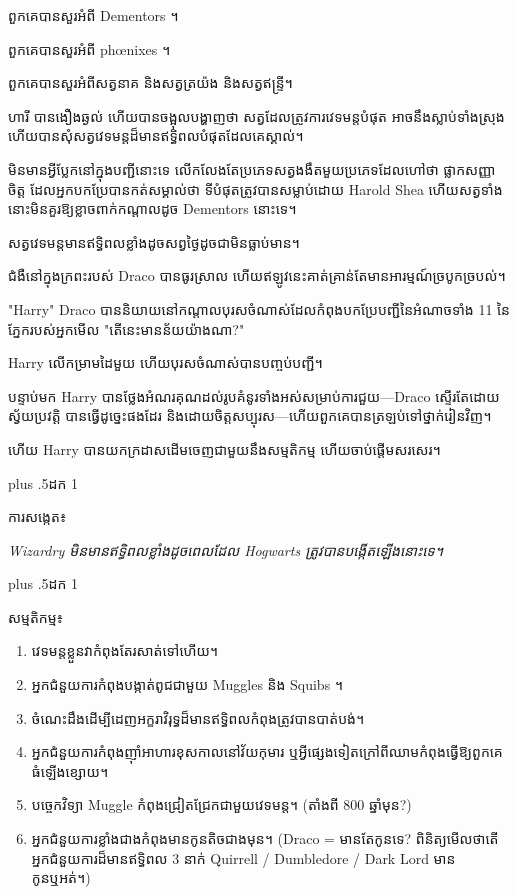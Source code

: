 {{{ពួកគេបានសួរអំពី Dementors ។

ពួកគេបានសួរអំពី phœnixes ។

ពួកគេ​បាន​សួរ​អំពី​សត្វ​នាគ និង​សត្វ​ត្រយ៉ង និង​សត្វ​ឥន្ទ្រី​។

ហារី បាន​ងឿងឆ្ងល់ ហើយ​បាន​ចង្អុល​បង្ហាញ​ថា សត្វ​ដែល​ត្រូវ​ការ​វេទមន្ត​បំផុត អាច​នឹង​ស្លាប់​ទាំង​ស្រុង ហើយ​បាន​សុំ​សត្វ​វេទមន្ត​ដ៏​មាន​ឥទ្ធិពល​បំផុត​ដែល​គេ​ស្គាល់។

មិនមានអ្វីប្លែកនៅក្នុងបញ្ជីនោះទេ លើកលែងតែប្រភេទសត្វងងឹតមួយប្រភេទដែលហៅថា ផ្លាកសញ្ញាចិត្ត ដែលអ្នកបកប្រែបានកត់សម្គាល់ថា ទីបំផុតត្រូវបានសម្លាប់ដោយ Harold Shea ហើយសត្វទាំងនោះមិនគួរឱ្យខ្លាចពាក់កណ្តាលដូច Dementors នោះទេ។

សត្វ​វេទមន្ត​មាន​ឥទ្ធិពល​ខ្លាំង​ដូច​សព្វ​ថ្ងៃ​ដូច​ជា​មិន​ធ្លាប់​មាន។

ជំងឺនៅក្នុងក្រពះរបស់ Draco បានធូរស្រាល ហើយឥឡូវនេះគាត់គ្រាន់តែមានអារម្មណ៍ច្របូកច្របល់។

"Harry" Draco បាននិយាយនៅកណ្តាលបុរសចំណាស់ដែលកំពុងបកប្រែបញ្ជីនៃអំណាចទាំង 11 នៃភ្នែករបស់អ្នកមើល "តើនេះមានន័យយ៉ាងណា?"

Harry លើកម្រាមដៃមួយ ហើយបុរសចំណាស់បានបញ្ចប់បញ្ជី។

បន្ទាប់មក Harry បានថ្លែងអំណរគុណដល់រូបគំនូរទាំងអស់សម្រាប់ការជួយ—Draco ស្ទើរតែដោយស្វ័យប្រវត្តិ បានធ្វើដូច្នេះផងដែរ និងដោយចិត្តសប្បុរស—ហើយពួកគេបានត្រឡប់ទៅថ្នាក់រៀនវិញ។

ហើយ Harry បាន​យក​ក្រដាស​ដើម​ចេញ​ជាមួយ​នឹង​សម្មតិកម្ម ហើយ​ចាប់​ផ្ដើម​សរសេរ។

\baselineskip plus .5\textheight ដក 1\baselineskip

\savetrivseps
\setlength{\topsep}{0pt}
\setlength{\partopsep}{0pt}

\begin{centering}
\begin{samepage}
\scshape ការសង្កេត៖

\itshape Wizardry មិនមានឥទ្ធិពលខ្លាំងដូចពេលដែល Hogwarts ត្រូវបានបង្កើតឡើងនោះទេ។
\end{samepage}

\baselineskip plus .5\textheight ដក 1\baselineskip

\begin{samepage}
\scshape សម្មតិកម្ម៖

\itshape
 \begin{enumerate}[1.]
\firmlist
 \setlength{\leftmargin}{\parindent}
\setlength{\rightmargin}{\parindent}
\item វេទមន្តខ្លួនវាកំពុងតែរសាត់ទៅហើយ។
\item អ្នកជំនួយការកំពុងបង្កាត់ពូជជាមួយ Muggles និង Squibs ។
\item ចំណេះដឹងដើម្បីដេញអក្ខរាវិរុទ្ធដ៏មានឥទ្ធិពលកំពុងត្រូវបានបាត់បង់។
\item អ្នកជំនួយការកំពុងញ៉ាំអាហារខុសកាលនៅវ័យកុមារ ឬអ្វីផ្សេងទៀតក្រៅពីឈាមកំពុងធ្វើឱ្យពួកគេធំឡើងខ្សោយ។
\item បច្ចេកវិទ្យា Muggle កំពុងជ្រៀតជ្រែកជាមួយវេទមន្ត។ (តាំងពី 800 ឆ្នាំមុន?)
\item អ្នកជំនួយការខ្លាំងជាងកំពុងមានកូនតិចជាងមុន។ (Draco = មានតែកូនទេ? ពិនិត្យមើលថាតើអ្នកជំនួយការដ៏មានឥទ្ធិពល 3 នាក់ Quirrell / Dumbledore / Dark Lord មានកូនឬអត់។)
\end{enumerate}
\end{samepage}


\end{centering}}}}
